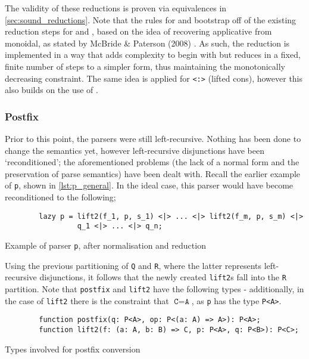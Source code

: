 The validity of these reductions is proven via equivalences in \autoref{sec:sound_reductions}.
Note that the rules for \texttt{\ap} and \texttt{\pa} bootstrap off of the existing reduction steps for \texttt{\mult} and \texttt{\fmap}, based on the idea of recovering applicative from monoidal, as stated by McBride \& Paterson (2008) \cite{mcbride08}.
As such, the reduction is implemented in a way that adds complexity to begin with but reduces in a fixed, finite number of steps to a simpler form, thus maintaining the monotonically decreasing constraint.
The same idea is applied for \texttt{<:>} (lifted cons), however this also builds on the use of \texttt{\ap}.

\subsubsection*{Postfix}

Prior to this point, the parsers were still left-recursive.
Nothing has been done to change the semantics yet, however left-recursive disjunctions have been `reconditioned'; the aforementioned problems (the lack of a normal form and the preservation of parse semantics) have been dealt with.
Recall the earlier example of \texttt{p}, shown in \autoref{lst:p_general}.
In the ideal case, this parser would have become reconditioned to the following;
\begin{capminted}
    \begin{verbatim}
        lazy p = lift2(f_1, p, s_1) <|> ... <|> lift2(f_m, p, s_m) <|>
                 q_1 <|> ... <|> q_n;
    \end{verbatim}
    \vspace{-0.5\baselineskip}
    \caption{Example of parser \texttt{p}, after normalisation and reduction}
    \label{lst:p_norm_reduce}
\end{capminted}

Using the previous partitioning of \texttt{Q} and \texttt{R}, where the latter represents left-recursive disjunctions, it follows that the newly created \texttt{lift2}s fall into the \texttt{R} partition.
Note that \texttt{postfix} and \texttt{lift2} have the following types - additionally, in the case of \texttt{lift2} there is the constraint that $\texttt{C} = \texttt{A}$, as \texttt{p} has the type \texttt{P<A>}.

\begin{capminted}
    \begin{verbatim}
        function postfix(q: P<A>, op: P<(a: A) => A>): P<A>;
        function lift2(f: (a: A, b: B) => C, p: P<A>, q: P<B>): P<C>;
    \end{verbatim}
    \vspace{-0.5\baselineskip}
    \caption{Types involved for postfix conversion}
    \label{lst:conv_types}
\end{capminted}

